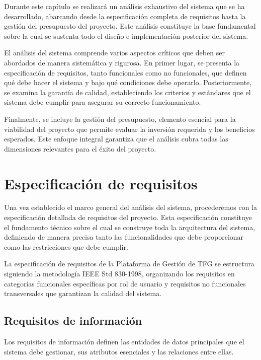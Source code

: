 \documentclass[12pt,a4paper,oneside]{report}
\begin{document}
Durante este capítulo se realizará un análisis exhaustivo del sistema
que se ha desarrollado, abarcando desde la especificación completa de
requisitos hasta la gestión del presupuesto del proyecto. Este análisis
constituye la base fundamental sobre la cual se sustenta todo el diseño
e implementación posterior del sistema.

El análisis del sistema comprende varios aspectos críticos que deben ser
abordados de manera sistemática y rigurosa. En primer lugar, se presenta
la especificación de requisitos, tanto funcionales como no funcionales,
que definen qué debe hacer el sistema y bajo qué condiciones debe
operarlo. Posteriormente, se examina la garantía de calidad,
estableciendo los criterios y estándares que el sistema debe cumplir
para asegurar su correcto funcionamiento.

Finalmente, se incluye la gestión del presupuesto, elemento esencial
para la viabilidad del proyecto que permite evaluar la inversión
requerida y los beneficios esperados. Este enfoque integral garantiza
que el análisis cubra todas las dimensiones relevantes para el éxito del
proyecto.

\section{Especificación de
requisitos}\label{especificaciuxf3n-de-requisitos}

Una vez establecido el marco general del análisis del sistema,
procederemos con la especificación detallada de requisitos del proyecto.
Esta especificación constituye el fundamento técnico sobre el cual se
construye toda la arquitectura del sistema, definiendo de manera precisa
tanto las funcionalidades que debe proporcionar como las restricciones
que debe cumplir.

La especificación de requisitos de la Plataforma de Gestión de TFG se
estructura siguiendo la metodología IEEE Std 830-1998, organizando los
requisitos en categorías funcionales específicas por rol de usuario y
requisitos no funcionales transversales que garantizan la calidad del
sistema.

\subsection{Requisitos de
información}\label{requisitos-de-informaciuxf3n}

Los requisitos de información definen las entidades de datos principales
que el sistema debe gestionar, sus atributos esenciales y las relaciones
entre ellas.
\end{document}
